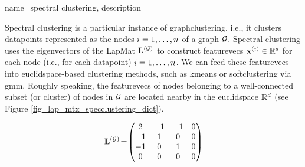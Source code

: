 {name={spectral clustering},
	description={Spectral \gls{clustering} is a particular instance of 
		\gls{graphclustering}, i.e., it clusters \glspl{datapoint} 
		represented as the nodes $i=1, \ldots, n$ of a \gls{graph} $\mathcal{G}$. 
		Spectral \gls{clustering} uses the \glspl{eigenvector} of the \gls{LapMat} ${\bf L}^{(\mathcal{G})}$ 
		to construct \glspl{featurevec} ${\bf x}^{(i)} \in \mathbb{R}^{d}$ 
		for each node (i.e., for each \gls{datapoint}) $i=1, \ldots, n$. We can feed these \glspl{featurevec} 
		into \gls{euclidspace}-based \gls{clustering} methods, such as \gls{kmeans} 
		or \gls{softclustering} via \gls{gmm}. Roughly speaking, the \glspl{featurevec} of nodes 
		belonging to a well-connected subset (or \gls{cluster}) of nodes in $\mathcal{G}$ are located 
		nearby in the \gls{euclidspace} $\mathbb{R}^{d}$ (see Figure \ref{fig_lap_mtx_specclustering_dict}). 
		\begin{figure}[H]
			\begin{center}
				\begin{minipage}{0.4\textwidth}
				\end{minipage} 
				\hspace*{5mm}
				\begin{minipage}{0.4\textwidth}
					\begin{equation} 
						{\bf L}^{(\mathcal{G})}\!=\!
						\begin{pmatrix} 
							2 & -1 & -1 & 0 \\ 
							-1 & 1 & 0 & 0 \\  
							-1 & 0 & 1 & 0 \\ 
							0 & 0 & 0 & 0 

\end{pmatrix}
\end{equation}
\end{minipage}
\end{center}
\end{figure}}}
